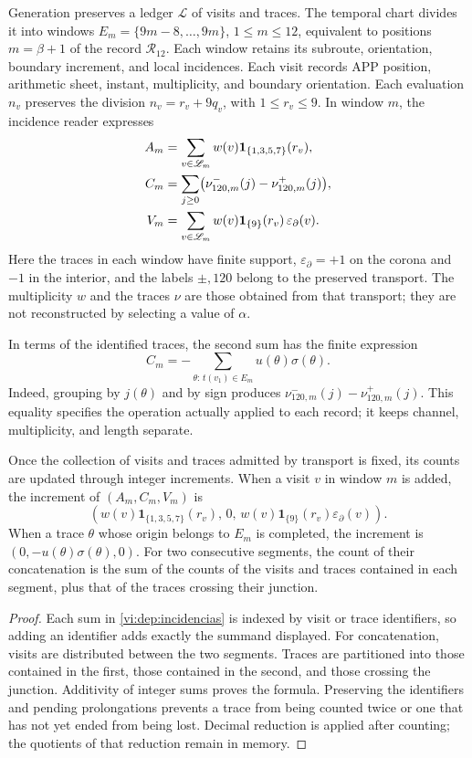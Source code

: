 Generation preserves a ledger \(\mathscr L\) of visits and traces.
The temporal chart divides it into windows
\(E_m=\{9m-8,\ldots,9m\}\), \(1\le m\le12\),
equivalent to positions \(m=\beta+1\) of the record
\(\mathcal R_{12}\). Each window retains its subroute,
orientation, boundary increment, and local incidences.
Each visit records APP position, arithmetic sheet, instant, multiplicity,
and boundary orientation. Each evaluation \(n_v\) preserves the
division \(n_v=r_v+9q_v\), with \(1\le r_v\le9\). In window
\(m\), the incidence reader expresses
\begin{align}
 A_m&=\sum_{v\in\mathscr L_m}w(v)
      \mathbf1_{\{1,3,5,7\}}(r_v),\notag\\
 C_m&=\sum_{j\ge0}
       \bigl(\nu^-_{120,m}(j)-\nu^+_{120,m}(j)\bigr),\notag\\
 V_m&=\sum_{v\in\mathscr L_m}w(v)
      \mathbf1_{\{9\}}(r_v)\,\varepsilon_{\partial}(v).
 \label{vi:dep:incidencias}
\end{align}
Here the traces in each window have finite support,
\(\varepsilon_{\partial}=+1\) on the corona and \(-1\) in the interior,
and the labels \(\pm,120\) belong to the preserved transport.
The multiplicity \(w\) and the traces \(\nu\) are those obtained from that
transport; they are not reconstructed by selecting a value of \(\alpha\).

In terms of the identified traces, the second sum has the finite
expression
\[
 C_m=-\sum_{\theta:\,t(v_1)\in E_m}u(\theta)\sigma(\theta).
\]
Indeed, grouping by \(j(\theta)\) and by sign produces
\(\nu^-_{120,m}(j)-\nu^+_{120,m}(j)\). This equality specifies
the operation actually applied to each record; it keeps
channel, multiplicity, and length separate.

\begin{proposition}
\label{vi:dep:libro-actualizacion}
Once the collection of visits and traces admitted by transport is fixed, its
counts are updated through integer increments. When a
visit \(v\) in window \(m\) is added, the increment of \((A_m,C_m,V_m)\) is
\[
 \left(w(v)\mathbf1_{\{1,3,5,7\}}(r_v),\,0,\,
 w(v)\mathbf1_{\{9\}}(r_v)\varepsilon_\partial(v)\right).
\]
When a trace \(\theta\) whose origin belongs to \(E_m\) is completed,
the increment is \((0,-u(\theta)\sigma(\theta),0)\).
For two consecutive segments, the count of their concatenation is
the sum of the counts of the visits and traces contained in each
segment, plus that of the traces crossing their junction.
\end{proposition}
\begin{proof}
Each sum in \eqref{vi:dep:incidencias} is indexed by visit
or trace identifiers, so adding an identifier adds
exactly the summand displayed. For concatenation, visits
are distributed between the two segments. Traces are partitioned into
those contained in the first, those contained in the second, and those
crossing the junction. Additivity of integer sums proves
the formula. Preserving the identifiers and pending
prolongations prevents a trace from being counted twice or one that has
not yet ended from being lost. Decimal reduction is applied after
counting; the quotients of that reduction remain in memory.
\end{proof}

